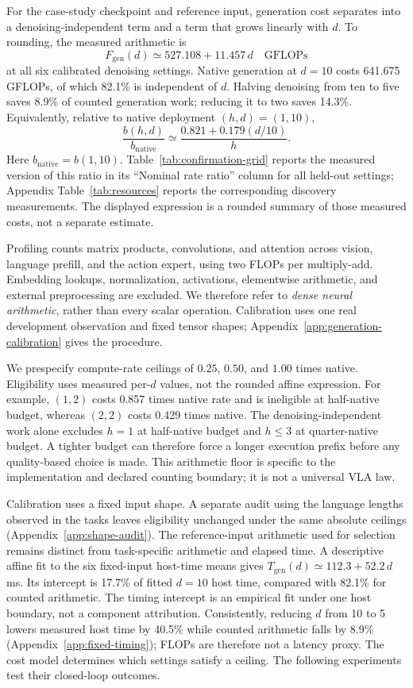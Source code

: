 \documentclass{article}
\begin{document}
For the case-study checkpoint and reference input, generation cost separates
into a denoising-independent term and a term that grows linearly with $d$. To
rounding, the measured arithmetic is
\[
 F_{\mathrm{gen}}(d) \simeq 527.108 + 11.457\,d\quad\text{GFLOPs}
\]
at all six calibrated denoising settings. Native generation at $d=10$ costs
641.675 GFLOPs, of which 82.1\% is independent of $d$. Halving denoising from
ten to five saves 8.9\% of counted generation work; reducing it to two saves
14.3\%. Equivalently, relative to native deployment $(h,d)=(1,10)$,
\[
 \frac{b(h,d)}{b_{\mathrm{native}}}
 \simeq \frac{0.821+0.179(d/10)}{h}.
\]
Here $b_{\mathrm{native}}=b(1,10)$. Table~\ref{tab:confirmation-grid} reports
the measured version of this ratio in its ``Nominal rate ratio'' column for all
held-out settings; Appendix Table~\ref{tab:resources} reports the corresponding
discovery measurements. The displayed expression is a rounded summary of those
measured costs, not a separate estimate.

Profiling counts matrix products, convolutions, and attention across vision,
language prefill, and the action expert, using two FLOPs per multiply-add.
Embedding lookups, normalization, activations, elementwise arithmetic, and
external preprocessing are excluded. We therefore refer to \emph{dense neural
arithmetic}, rather than every scalar operation. Calibration uses one real
development observation and fixed tensor shapes; Appendix~\ref{app:generation-calibration}
gives the procedure.

We prespecify compute-rate ceilings of $0.25$, $0.50$, and $1.00$ times native.
Eligibility uses measured per-$d$ values, not the rounded affine expression.
For example, $(1,2)$ costs 0.857 times native rate and is ineligible at half-native
budget, whereas $(2,2)$ costs 0.429 times native. The denoising-independent work
alone excludes $h=1$ at half-native budget and $h\leq3$ at quarter-native budget.
A tighter budget can therefore force a longer execution prefix before any
quality-based choice is made. This arithmetic floor is specific to the
implementation and declared counting boundary; it is not a universal VLA law.

Calibration uses a fixed input shape. A separate audit using the language lengths
observed in the tasks leaves eligibility unchanged under the same absolute
ceilings (Appendix~\ref{app:shape-audit}). The reference-input arithmetic used
for selection remains distinct from task-specific arithmetic and elapsed time.
A descriptive affine fit to the six fixed-input host-time means gives
$T_{\mathrm{gen}}(d) \simeq 112.3 + 52.2\,d$ ms. Its intercept is 17.7\% of fitted
$d=10$ host time, compared with 82.1\% for counted arithmetic. The timing
intercept is an empirical fit under one host boundary, not a component
attribution. Consistently, reducing $d$ from 10 to 5 lowers measured host time by
40.5\% while counted arithmetic falls by 8.9\%
(Appendix~\ref{app:fixed-timing}); FLOPs are therefore not a latency proxy. The
cost model determines which settings satisfy a ceiling. The following experiments
test their closed-loop outcomes.
\end{document}
